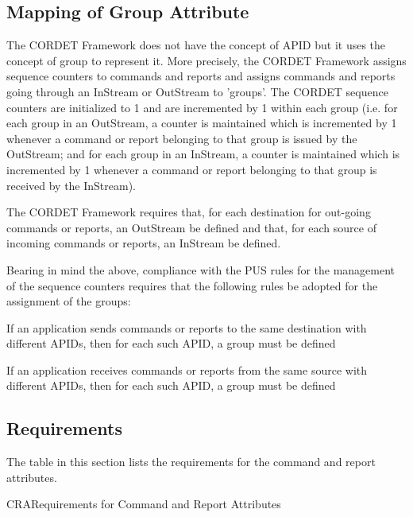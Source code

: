 \documentclass[a4paper,10pt]{article}
\newenvironment{fw_itemize}						%
{\begin{itemize}
  \setlength{\itemsep}{1mm}
  \setlength{\parskip}{0pt}
  \setlength{\parsep}{0pt}}
{\end{itemize}}
\newenvironment{cr_req}[2]
{
\begin{longtable}{|l|p{11.8cm}|}
\caption{#2}\label{tab:Req-#1} \\
\hline
\rowcolor{light-gray}
\textbf{Req. ID} & \textbf{Requirement Text}\\
\hline\hline
\endfirsthead
\rowcolor{light-gray}
\textbf{Req. ID} & \textbf{Requirement Text}\\
\hline\hline
\endhead
\DTLforeach*[\DTLiseq{\cat}{#1}]{dbReq}{\cat=Category,\type=Type,\id=Id,\reqText=Text}
{\DTLiffirstrow{}{\\\hline}P-\cat-\id/\type & \textit{\reqText}}\\\hline
}
{\end{longtable}}
\begin{document}
\subsection{Mapping of Group Attribute}\label{sec:mapGroup}
The CORDET Framework does not have the concept of APID but it uses the concept of group to represent it. More precisely, the CORDET Framework assigns sequence counters to commands and reports and assigns commands and reports going through an InStream or OutStream to 'groups'. The CORDET sequence counters are initialized to 1 and are incremented by 1 within each group (i.e. for each group in an OutStream, a counter is maintained which is incremented by 1 whenever a command or report belonging to that group is issued by the OutStream; and for each group in an InStream, a counter is maintained which is incremented by 1 whenever a command or report belonging to that group is received by the InStream). 

The CORDET Framework requires that, for each destination for out-going commands or reports, an OutStream be defined and that, for each source of incoming commands or reports, an InStream be defined. 

Bearing in mind the above, compliance with the PUS rules for the management of the sequence counters requires that the following rules be adopted for the assignment of the groups: 

\begin{fw_itemize}
\item If an application sends commands or reports to the same destination with different APIDs, then for each such APID, a group must be defined
\item If an application receives commands or reports from the same source  with different APIDs, then for each such APID, a group must be defined
\end{fw_itemize}


\newpage
\subsection{Requirements}
The table in this section lists the requirements for the command and report attributes.

\begin{cr_req}{CRA}{Requirements for Command and Report Attributes}
\end{cr_req}
 
\end{document}
